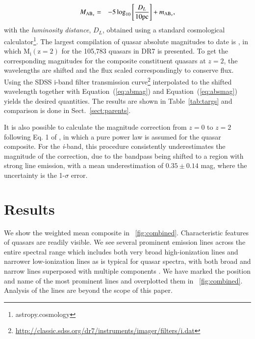 \documentclass{aa}    %
\newcommand{\figref}[1]{\ref{fig:#1}}
\newcommand{\Fig}[1]{\figurename~\figref{#1}}
\newcommand{\fig}[1]{\Fig{#1}}
\newcommand{\Tab}[1]{Table~\ref{tab:#1}}
\newcommand{\tab}[1]{\Tab{#1}}
\newcommand{\Eq}[1]{Equation~(\ref{eq:#1})}
\newcommand{\eq}[1]{\Eq{#1}}
\newcommand{\eqlabel}[1]{\label{eq:#1}}
\newcommand{\sectionname}{Sect.}
\newcommand{\Sect}[1]{\sectionname~\ref{sect:#1}}
\newcommand{\sect}[1]{\Sect{#1}}
\newcommand{\sectlabel}[1]{\label{sect:#1}}
\begin{document}
\begin{eqnarray}\eqlabel{absmag}
M_{\textmd{AB}_x} &=& -5 \log_{10} \left[  \frac{D_L }{10 \mathrm{pc}}   \right] + m_{\textmd{AB}_x} ,
\end{eqnarray}
with the \textit{luminosity distance}, $D_L$,  obtained using a standard cosmological calculator\footnote{astropy.cosmology}.
 The largest compilation of quasar absolute magnitudes to date is \cite{Shen2011}, in which $\mathrm{M_i (z=2)}$ for the 105,783 quasars in DR7 is presented. To get the corresponding magnitudes for the composite constituent quasars at $z = 2$, the wavelengths are shifted and the flux scaled correspondingly to conserve flux. Using the SDSS i-band filter transmission curve\footnote{\url{http://classic.sdss.org/dr7/instruments/imager/filters/i.dat}} interpolated to the shifted wavelength together with \eq{abmag} and \eq{absmag} yields the desired quantities. The results are shown in \tab{targs} and comparison is done in \sect{parents}.
 
 It is also possible to calculate the magnitude correction from $z = 0$ to $z = 2$ following Eq. 1 of \cite{Richards2006a}, in which a pure power law is assumed for the quasar composite. For the \textit{i}-band, this procedure consistently underestimates the magnitude of the correction, due to the bandpass being shifted to a region with strong line emission, with a mean underestimation of $0.35 \pm 0.14$ mag, where the uncertainty is the 1-$\sigma$ error.







\section{Results}   \sectlabel{results}


We show the weighted mean composite in \fig{combined}. Characteristic features of quasars are readily visible. We see several prominent emission lines across the entire spectral range which includes both very broad high-ionization lines and narrower low-ionization lines as is typical for quasar spectra, with both broad and narrow lines superposed with multiple components \citep{Baldwin1995}. We have marked the position and name of the most prominent lines and overplotted them in \fig{combined}.  Analysis of the lines are beyond the scope of this paper.
\end{document}
